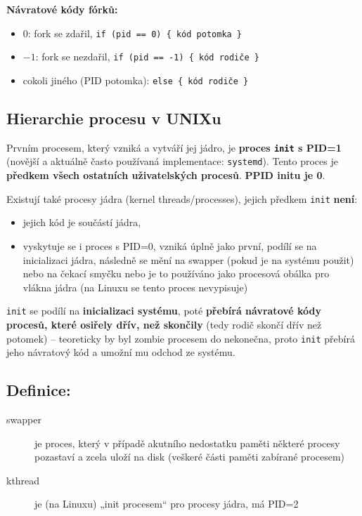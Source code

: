 \documentclass[a4paper, 11pt]{article}
\newcommand{\tcmd}[1]{\texttt{#1}}
\begin{document}
\textbf{Návratové kódy fórků:}
\begin{itemize}
    \item $0$: fork se zdařil, \verb|if (pid == 0) { kód potomka }|
    \item $-1$: fork se nezdařil, \verb|if (pid == -1) { kód rodiče }|
    \item cokoli jiného (PID potomka): \verb|else { kód rodiče }|
\end{itemize}
 
\subsection{Hierarchie procesu v UNIXu}
Prvním procesem, který vzniká a vytváří jej jádro, je \textbf{proces \tcmd{init} s PID=1} (novější a aktuálně často používaná implementace: \tcmd{systemd}). Tento proces je \textbf{předkem všech ostatních uživatelských procesů}. \textbf{PPID initu je 0}.
 
Existují také procesy jádra (kernel threads/processes), jejich předkem \tcmd{init} \textbf{není}:
\begin{itemize}
    \item jejich kód je součástí jádra,
    \item vyskytuje se i proces s PID=0, vzniká úplně jako první, podílí se na inicializaci jádra, následně se mění na swapper (pokud je na systému použit) nebo na čekací smyčku nebo je to používáno jako procesová obálka pro vlákna jádra (na Linuxu se tento proces nevypisuje)
\end{itemize}
 
\tcmd{init} se podílí na \textbf{inicializaci systému}, poté \textbf{přebírá návratové kódy procesů, které osiřely dřív, než skončily} (tedy rodič skončí dřív než potomek) -- teoreticky by byl zombie procesem do nekonečna, proto \tcmd{init} přebírá jeho návratový kód a umožní mu odchod ze systému.
 
\subsection*{Definice:}
\begin{description}
\item[swapper] je proces, který v případě akutního nedostatku paměti některé procesy pozastaví a zcela uloží na disk (veškeré části paměti zabírané procesem)

\item[kthread] je (na Linuxu) „init procesem“ pro procesy jádra, má PID=2 
\end{description}
\end{document}
